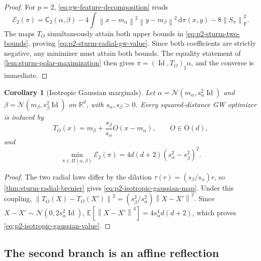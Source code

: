\documentclass[11pt,a4paper]{article}
\newtheorem{corollary}[theorem]{Corollary}
\theoremstyle{definition}
\theoremstyle{remark}
\newcommand{\R}{\mathbb R}
\newcommand{\Ecal}{\mathcal E}
\newcommand{\Piopt}{\Pi}
\newcommand{\Id}{\operatorname{Id}}
\newcommand{\dd}{\,\mathrm d}
\newcommand{\norm}[1]{\left\lVert #1\right\rVert}
\begin{document}
\begin{proof}
For \(p=2\), \eqref{eq:gw-feature-decomposition} reads
\begin{equation*}
  \Ecal_2(\pi)
  =\mathsf C_2(\alpha,\beta)
   -4\int\norm{x-m_\alpha}^2\norm{y-m_\beta}^2\dd\pi(x,y)
   -8\norm{S_\pi}_{\mathrm F}^2.
\end{equation*}
The maps \(T_O\) simultaneously attain both upper bounds in
\eqref{eq:p2-sturm-two-bounds}, proving
\eqref{eq:p2-sturm-radial-gw-value}.  Since both coefficients are strictly
negative, any minimizer must attain both bounds.  The equality statement of
\cref{lem:sturm-polar-maximization} then gives
\(\pi=(\Id,T_O)_\sharp\alpha\), and the converse is immediate.
\end{proof}

\begin{corollary}[Isotropic Gaussian marginals]
\label{cor:p2-isotropic-gaussian-monge}
Let
\(\alpha=\mathcal N(m_\alpha,s_\alpha^2\Id)\) and
\(\beta=\mathcal N(m_\beta,s_\beta^2\Id)\) on \(\R^d\), with
\(s_\alpha,s_\beta>0\).  Every squared-distance GW optimizer is induced by
\begin{equation}
  T_O(x)
  =m_\beta+\frac{s_\beta}{s_\alpha}O(x-m_\alpha),
  \qquad O\in\mathrm O(d),
  \label{eq:p2-isotropic-gaussian-map}
\end{equation}
and
\begin{equation}
  \min_{\pi\in\Piopt(\alpha,\beta)}\Ecal_2(\pi)
  =4d(d+2)(s_\alpha^2-s_\beta^2)^2.
  \label{eq:p2-isotropic-gaussian-value}
\end{equation}
\end{corollary}

\begin{proof}
The two radial laws differ by the dilation
\(\tau(r)=(s_\beta/s_\alpha)r\), so
\cref{thm:sturm-radial-brenier} gives
\eqref{eq:p2-isotropic-gaussian-map}.  Under this coupling,
\(\norm{T_O(X)-T_O(X')}^2=(s_\beta^2/s_\alpha^2)\norm{X-X'}^2\).
Since \(X-X'\sim\mathcal N(0,2s_\alpha^2\Id)\),
\(\mathbb E[\norm{X-X'}^4]=4s_\alpha^4d(d+2)\), which proves
\eqref{eq:p2-isotropic-gaussian-value}.
\end{proof}

\subsection{The second branch is an affine reflection}
\end{document}

